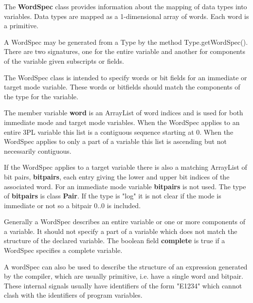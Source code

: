             The {\bf WordSpec} class provides information about the
            mapping of data types into variables. Data types are mapped
            as a 1-dimensional array of words. Each word is a primitive.
            
            A WordSpec may be generated from a Type by the method
            Type.getWordSpec(). There are two signatures, one for the
            entire variable and another for components of the variable
            given subscripts or fields.
            
            The WordSpec class is intended to specify words or bit fields
            for an immediate or target mode variable. These words or bitfields
            should match the components of the type for the variable.

            The member variable {\bf word} is an ArrayList of word indices and is
            used for both immediate mode and target mode variables. When
            the WordSpec applies to an entire 3PL variable this list is a
            contiguous sequence starting at 0. When the WordSpec applies to only a
            part of a variable this list is ascending but not necessarily
            contiguous.
            
            If the WordSpec applies to a target variable there is also a
            matching ArrayList of bit pairs, {\bf bitpairs}, each entry giving the lower
            and upper bit indices of the associated word. For an immediate mode
            variable {\bf bitpairs} is not used. The type of {\bf bitpairs} is
            class {\bf Pair}. If the type is "log" it is not clear if the mode
            is immediate or not so a bitpair 0..0 is included.
            
            Generally a WordSpec describes an entire variable or one or more
            components of a variable. It should not specify a part of a variable
            which does not match the structure of the declared variable.
            The boolean field {\bf complete} is true if a WordSpec specifies a complete
            variable.
            
            A wordSpec can also be used to describe the structure of an expression
            generated by the compiler, which are usually primitive, i.e. have a
            single word and bitpair. These internal signals usually have
            identifiers of the form "E1234" which cannot clash with the
            identifiers of program variables.
            
